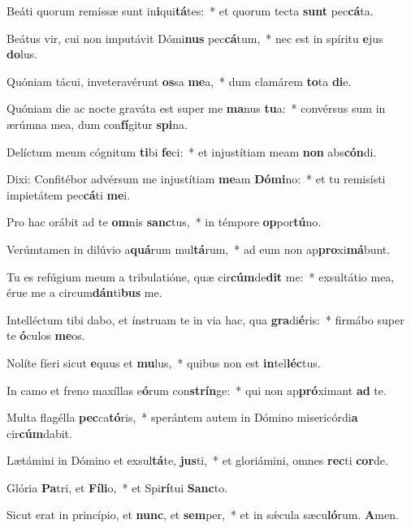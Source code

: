 \item Beáti quorum remíssæ sunt in\textbf{i}qui\textbf{tá}tes:~* et quorum tecta \textbf{sunt} pec\textbf{cá}ta.
\item Beátus vir, cui non imputávit Dómi\textbf{nus} pec\textbf{cá}tum,~* nec est in spíritu \textbf{e}jus \textbf{do}lus.
\item Quóniam tácui, inveteravérunt \textbf{os}sa \textbf{me}a,~* dum clamárem \textbf{to}ta \textbf{di}e.
\item Quóniam die ac nocte graváta est super me \textbf{ma}nus \textbf{tu}a:~* convérsus sum in ærúmna mea, dum con\textbf{fí}gitur \textbf{spi}na.
\item Delíctum meum cógnitum \textbf{ti}bi \textbf{fe}ci:~* et injustítiam meam \textbf{non} abs\textbf{cón}di.
\item Dixi: Confitébor advérsum me injustítiam \textbf{me}am \textbf{Dó}\textbf{mi}no:~* et tu remisísti impietátem pec\textbf{cá}ti \textbf{me}i.
\item Pro hac orábit ad te \textbf{om}nis \textbf{sanc}tus,~* in témpore \textbf{op}por\textbf{tú}no.
\item Verúmtamen in dilúvio a\textbf{quá}rum mul\textbf{tá}rum,~* ad eum non ap\textbf{pro}xi\textbf{má}bunt.
\item Tu es refúgium meum a tribulatióne, quæ cir\textbf{cúm}de\textbf{dit} me:~* exsultátio mea, érue me a circum\textbf{dán}ti\textbf{bus} me.
\item Intelléctum tibi dabo, et ínstruam te in via hac, qua \textbf{gra}di\textbf{é}ris:~* firmábo super te \textbf{ó}culos \textbf{me}os.
\item Nolíte fíeri sicut \textbf{e}quus et \textbf{mu}lus,~* quibus non est \textbf{in}tel\textbf{léc}tus.
\item In camo et freno maxíllas e\textbf{ó}rum con\textbf{strín}ge:~* qui non ap\textbf{pró}ximant \textbf{ad} te.
\item Multa flagélla \textbf{pec}ca\textbf{tó}ris,~* sperántem autem in Dómino misericórdi\textbf{a} cir\textbf{cúm}dabit.
\item Lætámini in Dómino et exsul\textbf{tá}te, \textbf{jus}ti,~* et gloriámini, omnes \textbf{rec}ti \textbf{cor}de.
\item Glória \textbf{Pa}tri, et \textbf{Fí}\textbf{li}o,~* et Spi\textbf{rí}tui \textbf{Sanc}to.
\item Sicut erat in princípio, et \textbf{nunc}, et \textbf{sem}per,~* et in sǽcula sæcu\textbf{ló}rum. \textbf{A}men.
